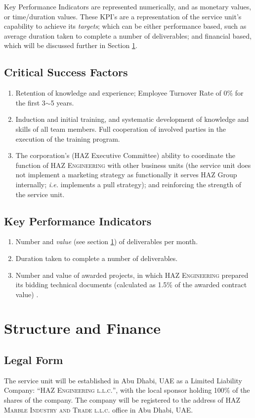 \documentclass[a4paper,oneside,12pt,final]{article}
\begin{document}
Key Performance Indicators are represented numerically, and as monetary values, or time/duration values. These KPI's are a representation of the service unit's capability to achieve its \emph{targets}; which can be either performance based, such as average duration taken to complete a number of deliverables; and financial based, which will be discussed further in Section \ref{sec:finance}.

\subsection{Critical Success Factors}
\begin{enumerate}
	\item Retention of knowledge and experience; Employee Turnover Rate of 0\% for the first 3$\sim$5 years.
	\item Induction and initial training, and systematic development of knowledge and skills of all team members. Full cooperation of involved parties in the execution of the training program.
	\item The corporation's (HAZ Executive Committee) ability to coordinate the function of \textsc{HAZ Engineering} with other business units (the service unit does not implement a marketing strategy as functionally it serves HAZ Group internally; \emph{i.e.} implements a pull strategy); and reinforcing the strength of the service unit.
\end{enumerate}

\subsection{Key Performance Indicators}
\begin{enumerate}
	\item Number and \emph{value} (see section \ref{sec:finance}) of deliverables per month.
	\item Duration taken to complete a number of deliverables.
	\item Number and value of awarded projects, in which \textsc{HAZ Engineering} prepared its bidding technical documents (calculated as 1.5\% of the awarded contract value) .
\end{enumerate}

\section{Structure and Finance}
\label{sec:finance}

\subsection{Legal Form}
The service unit will be established in Abu Dhabi, UAE as a Limited Liability Company: ``\textsc{HAZ Engineering l.l.c.}'', with the local sponsor holding 100\% of the shares of the company. The company will be registered to the address of \textsc{HAZ Marble Industry and Trade l.l.c.} office in Abu Dhabi, UAE.
\end{document}
